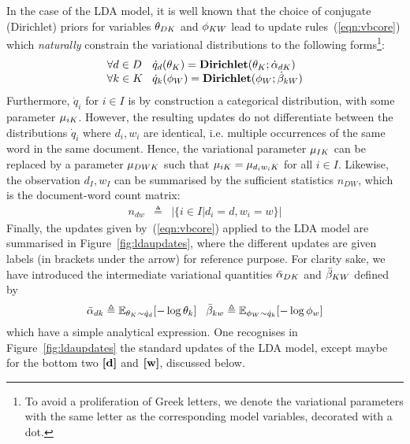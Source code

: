 In the case of the LDA model, it is well known that the choice of conjugate (Dirichlet) priors for variables $\theta_{DK}$ and $\phi_{KW}$ lead to update rules~(\ref{eqn:vbcore}) which {\em naturally} constrain the variational distributions to the following forms\footnote{To avoid a proliferation of Greek letters, we denote the variational parameters with the same letter as the corresponding model variables, decorated with a dot.}:
\[
\begin{array}{l@{\hspace{.3cm}}l}
\forall d\in D& \dot{q}_d(\vmDK_K) = \mathbf{Dirichlet}(\vmDK_K;\vvmDK_{dK}) \\
\forall k\in K& \dot{q}_k(\vmKW_W) = \mathbf{Dirichlet}(\vmKW_W;\vvmKW_{kW})
\end{array}
\]
Furthermore, $\dot{q}_i$ for $i\in I$ is by construction a categorical distribution, with some parameter $\mu_{iK}$. However, the resulting updates do not differentiate between the distributions $\dot{q}_i$ where $d_i,w_i$ are identical, i.e. multiple occurrences of the same word in the same document. Hence, the variational parameter $\mu_{IK}$ can be replaced by a parameter $\mu_{DWK}$ such that $\mu_{iK}=\mu_{d_iw_iK}$ for all $i\in I$. Likewise, the observation $d_I,w_I$ can be summarised by the sufficient statistics $n_{DW}$, which is the document-word count matrix:
\begin{eqnarray*}
n_{dw} & \triangleq & |\{i\in I|d_i=d,w_i=w\}|
\end{eqnarray*}
Finally, the updates given by~(\ref{eqn:vbcore}) applied to the LDA model are summarised in Figure~\ref{fig:ldaupdates}, where the different updates are given labels (in brackets under the arrow) for reference purpose. For clarity sake, we have introduced the intermediate variational quantities $\bar{\alpha}_{DK}$ and $\bar{\beta}_{KW}$ defined by
\[
\bar{\alpha}_{dk}\triangleq\mathbb{E}_{\theta_K\sim\dot{q}_d}[-\log\theta_k]
\hspace{.3cm}
\bar{\beta}_{kw}\triangleq\mathbb{E}_{\phi_W\sim\dot{q}_k}[-\log\phi_w]
\]
which have a simple analytical expression. One recognises in Figure~\ref{fig:ldaupdates} the standard updates of the LDA model, except maybe for the bottom two $\textbf{[d]}$ and $\textbf{[w]}$, discussed below.
